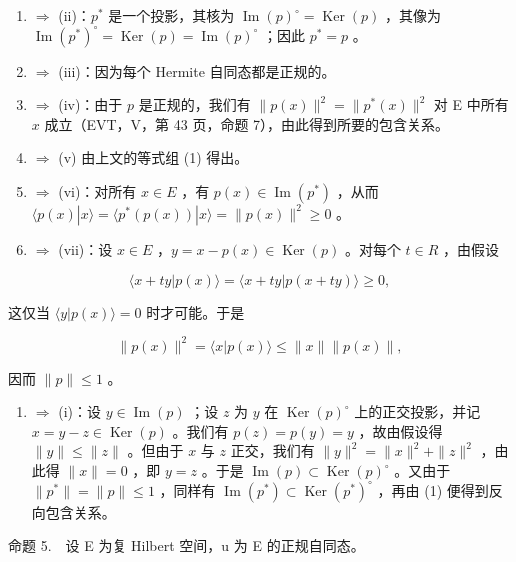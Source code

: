 \begin{enumerate}
\def\labelenumi{(\roman{enumi})}
\item
  \(\Longrightarrow\) (ii)：\(p^{*}\) 是一个投影，其核为 \(\operatorname{Im}(p)^{\circ} = \operatorname{Ker}(p)\) ，其像为 \(\operatorname{Im}(p^{*})^{\circ} = \operatorname{Ker}(p) = \operatorname{Im}(p)^{\circ}\) ；因此 \(p^{*} = p\) 。
\item
  \(\Longrightarrow\) (iii)：因为每个 Hermite 自同态都是正规的。
\item
  \(\Longrightarrow\) (iv)：由于 \(p\) 是正规的，我们有 \(\| p(x)\|^2 = \| p^*(x)\|^2\) 对 E 中所有 \(x\) 成立（EVT，V，第 43 页，命题 7），由此得到所要的包含关系。
\item
  \(\Longrightarrow\) (v) 由上文的等式组 (1) 得出。
\item
  \(\Longrightarrow\) (vi)：对所有 \(x \in E\) ，有 \(p(x) \in \operatorname{Im}(p^{*})\) ，从而 \(\langle p(x)|x\rangle = \langle p^{*}(p(x))|x\rangle = \|p(x)\|^{2} \geqslant 0\) 。
\item
  \(\Longrightarrow\) (vii)：设 \(x \in E\) ，\(y = x - p(x) \in \operatorname{Ker}(p)\) 。对每个 \(t \in R\) ，由假设
\end{enumerate}

\[
\langle x + t y | p (x) \rangle = \langle x + t y | p (x + t y) \rangle \geqslant 0,
\]

这仅当 \(\langle y|p(x)\rangle = 0\) 时才可能。于是

\[
\| p (x) \| ^ {2} = \langle x | p (x) \rangle \leqslant \| x \| \| p (x) \|,
\]

因而 \(\|p\|\leqslant1\) 。

\begin{enumerate}
\def\labelenumi{(\roman{enumi})}
\setcounter{enumi}{6}
\tightlist
\item
  \(\Longrightarrow\) (i)：设 \(y \in \operatorname{Im}(p)\) ；设 \(z\) 为 \(y\) 在 \(\operatorname{Ker}(p)^{\circ}\) 上的正交投影，并记 \(x = y - z \in \operatorname{Ker}(p)\) 。我们有 \(p(z) = p(y) = y\) ，故由假设得 \(\|y\| \leqslant \|z\|\) 。但由于 \(x\) 与 \(z\) 正交，我们有 \(\|y\|^2 = \|x\|^2 + \|z\|^2\) ，由此得 \(\|x\| = 0\) ，即 \(y = z\) 。于是 \(\operatorname{Im}(p) \subset \operatorname{Ker}(p)^{\circ}\) 。又由于 \(\|p^*\| = \|p\| \leqslant 1\) ，同样有 \(\operatorname{Im}(p^*) \subset \operatorname{Ker}(p^*)^{\circ}\) ，再由 (1) 便得到反向包含关系。
\end{enumerate}

命题 5.　设 E 为复 Hilbert 空间，u 为 E 的正规自同态。

